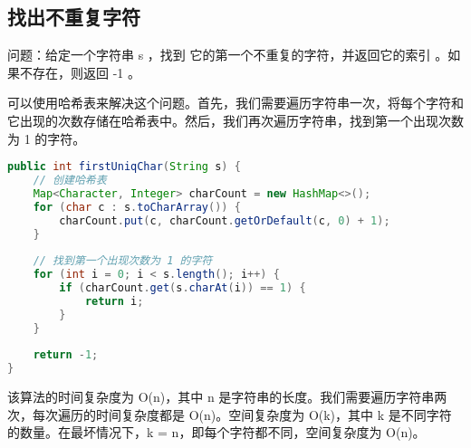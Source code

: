 \documentclass[../../../interview-questions.tex]{subfiles}
\begin{document}
\subsection{找出不重复字符}

问题：给定一个字符串 s ，找到 它的第一个不重复的字符，并返回它的索引 。如果不存在，则返回 -1 。

可以使用哈希表来解决这个问题。首先，我们需要遍历字符串一次，将每个字符和它出现的次数存储在哈希表中。然后，我们再次遍历字符串，找到第一个出现次数为 1 的字符。

\begin{lstlisting}[language=Java]
public int firstUniqChar(String s) {
    // 创建哈希表
    Map<Character, Integer> charCount = new HashMap<>();
    for (char c : s.toCharArray()) {
        charCount.put(c, charCount.getOrDefault(c, 0) + 1);
    }
    
    // 找到第一个出现次数为 1 的字符
    for (int i = 0; i < s.length(); i++) {
        if (charCount.get(s.charAt(i)) == 1) {
            return i;
        }
    }
    
    return -1;
}    
\end{lstlisting}


该算法的时间复杂度为 O(n)，其中 n 是字符串的长度。我们需要遍历字符串两次，每次遍历的时间复杂度都是 O(n)。空间复杂度为 O(k)，其中 k 是不同字符的数量。在最坏情况下，k = n，即每个字符都不同，空间复杂度为 O(n)。
\end{document}

